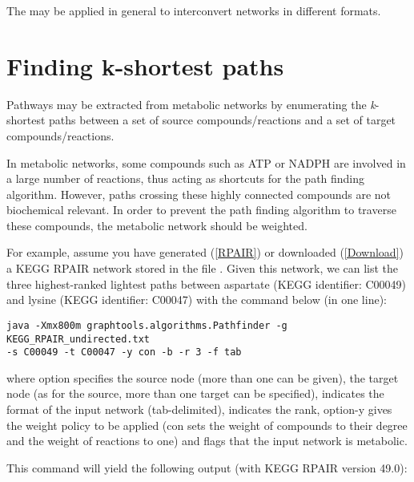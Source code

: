 The  may be applied in general to interconvert networks
in different formats.

\section{Finding k-shortest paths}

Pathways may be extracted from metabolic networks by enumerating the
\textit{k}-shortest paths between a set of source compounds/reactions and a
set of target compounds/reactions.

In metabolic networks, some compounds such as ATP or NADPH are involved in a
large number of reactions, thus acting as shortcuts for the path finding
algorithm. However, paths crossing these highly connected compounds are not
biochemical relevant. In order to prevent the path finding algorithm to traverse
these compounds, the metabolic network should be weighted.

For example, assume you have generated (\ref{RPAIR}) or downloaded
(\ref{Download}) a KEGG RPAIR network stored in the file 
. Given this network, we can list the 
three highest-ranked lightest paths between
aspartate (KEGG identifier: C00049) and lysine (KEGG identifier: C00047) with
the command below (in one line):

\begin{verbatim}
java -Xmx800m graphtools.algorithms.Pathfinder -g KEGG_RPAIR_undirected.txt 
-s C00049 -t C00047 -y con -b -r 3 -f tab
\end{verbatim}

where option  specifies the source node (more than one can be given),
 the target node (as for the source, more than one target can be
specified), indicates the format of the input network
(tab-delimited),  indicates the rank, option{-y} gives the weight policy to be applied
(con sets the weight of compounds to their degree and the weight of reactions
to one) and  flags that the input network is metabolic.

This command will yield the following output (with KEGG RPAIR version 49.0):

